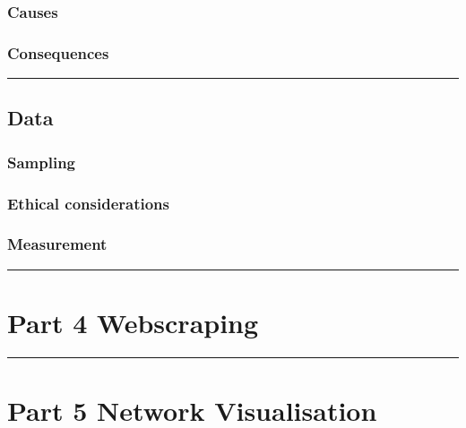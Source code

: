 \documentclass[
]{book}
\begin{document}
\hypertarget{causes-4}{%
\section{Causes}\label{causes-4}}

\hypertarget{consequences-4}{%
\section{Consequences}\label{consequences-4}}

\begin{center}\rule{0.5\linewidth}{0.5pt}\end{center}

\hypertarget{data-2}{%
\chapter{Data}\label{data-2}}

\hypertarget{sampling-2}{%
\section{Sampling}\label{sampling-2}}

\hypertarget{ethical-considerations-2}{%
\section{Ethical considerations}\label{ethical-considerations-2}}

\hypertarget{measurement-2}{%
\section{Measurement}\label{measurement-2}}

\begin{center}\rule{0.5\linewidth}{0.5pt}\end{center}

\hypertarget{part-part-4-webscraping}{%
\part{Part 4 Webscraping}\label{part-part-4-webscraping}}

\begin{center}\rule{0.5\linewidth}{0.5pt}\end{center}

\hypertarget{part-part-5-network-visualisation}{%
\part{Part 5 Network Visualisation}\label{part-part-5-network-visualisation}}
\end{document}
